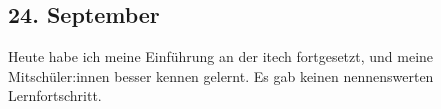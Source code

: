 \subsection{24. September}
Heute habe ich meine Einführung an der itech fortgesetzt, und meine Mitschüler:innen besser kennen gelernt. Es gab keinen nennenswerten Lernfortschritt. 